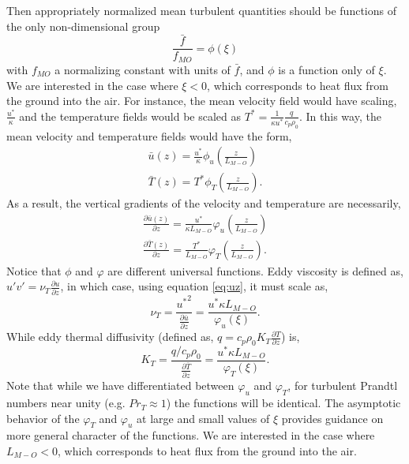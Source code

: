 Then appropriately normalized mean turbulent quantities should be
functions of the only non-dimensional group 
\begin{equation}
 \frac{\bar f}{f_{MO}} = \phi(\xi)
\end{equation}
with $f_{MO}$ a normalizing constant with units of $\bar f$, and $\phi$ is a
function only of $\xi$. We are interested in the case where $\xi<0$, which
corresponds to heat flux from the ground into the air.
For instance, the mean velocity field would have
scaling, $\frac{u^*}{\kappa}$ and the temperature fields would be scaled
as $T^* = \frac{1}{\kappa u^*} \frac{q}{c_p \rho_0}$. In this way, the
mean velocity and temperature fields would have the form, 
\begin{eqnarray}
\bar u(z) = \frac{u^*}{\kappa} \phi_u(\frac{z}{L_{M-O}}) \\
\bar T(z) = T^* \phi_T(\frac{z}{L_{M-O}}).
\end{eqnarray}
As a result, the vertical gradients of the velocity and temperature are
necessarily, 
\begin{eqnarray}
\frac{\partial \bar u(z)}{\partial z} = \frac{u^*}{\kappa L_{M-O}}
 \varphi_u(\frac{z}{L_{M-O}}) \label{eq:uz} \\ 
\frac{\partial \bar T(z)}{\partial z} = \frac{T^*}{L_{M-O}}
 \varphi_T(\frac{z}{L_{M-O}}) \label{eq:tz}.
\end{eqnarray}
Notice that $\phi$ and $\varphi$ are different universal functions. Eddy
viscosity is defined as, $u'v' = \nu_T \frac{\partial
u}{\partial z}$\cite{durbin2001statistical}, in which case, using
equation \ref{eq:uz}, it must scale as,  
\begin{equation}
 \nu_T = \frac{{u^*}^2}{\frac{\partial \bar u}{\partial z}} = \frac{u^*
  \kappa L_{M-O}}{\varphi_u(\xi)}.
\end{equation}
While eddy thermal diffusivity (defined as, $q = c_p \rho_0 K_T \frac{\partial T}{\partial
z}$) is, 
\begin{equation}
 K_T = \frac{q/c_p \rho_0}{\frac{\partial \bar T}{\partial z}} = \frac{u^*
  \kappa L_{M-O}}{\varphi_T(\xi)}.
\label{eqn:eddy_kt}
\end{equation}
Note that while we have differentiated between $\varphi_u$ and
$\varphi_T$, for turbulent Prandtl numbers near unity (e.g. $Pr_T
\approx 1$) the functions will be identical. The asymptotic behavior of
the $\varphi_T$ and $\varphi_u$ at 
large and small values of $\xi$ provides guidance on more general character of the
functions. We are interested in the case where $L_{M-O}<0$, which corresponds to 
heat flux from the ground into the air. 
%


